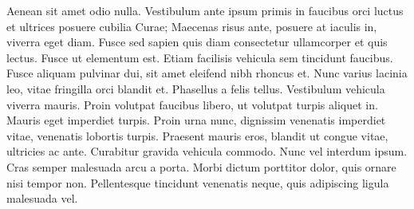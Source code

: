 Aenean sit amet odio nulla.
Vestibulum ante ipsum primis in faucibus orci luctus et ultrices posuere cubilia Curae; Maecenas risus ante, posuere at iaculis in, viverra eget diam.
Fusce sed sapien quis diam consectetur ullamcorper et quis lectus.
Fusce ut elementum est.
Etiam facilisis vehicula sem tincidunt faucibus.
Fusce aliquam pulvinar dui, sit amet eleifend nibh rhoncus et.
Nunc varius lacinia leo, vitae fringilla orci blandit et.
Phasellus a felis tellus.
Vestibulum vehicula viverra mauris.
Proin volutpat faucibus libero, ut volutpat turpis aliquet in.
Mauris eget imperdiet turpis.
Proin urna nunc, dignissim venenatis imperdiet vitae, venenatis lobortis turpis.
Praesent mauris eros, blandit ut congue vitae, ultricies ac ante.
Curabitur gravida vehicula commodo.
Nunc vel interdum ipsum.
Cras semper malesuada arcu a porta.
Morbi dictum porttitor dolor, quis ornare nisi tempor non.
Pellentesque tincidunt venenatis neque, quis adipiscing ligula malesuada vel.

